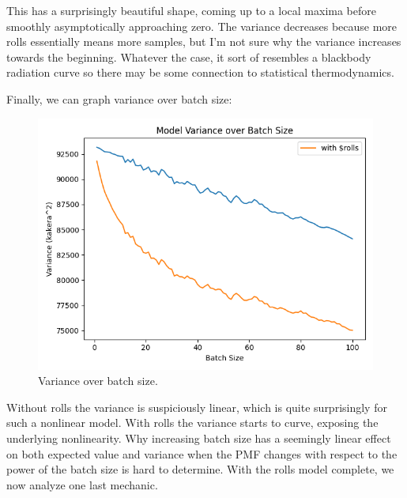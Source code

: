 \documentclass[11pt, oneside]{article}
\theoremstyle{plain}
\theoremstyle{definition}
\begin{document}
This has a surprisingly beautiful shape, coming up to a local maxima
before smoothly asymptotically approaching zero. The variance decreases
because more rolls essentially means more samples, but I'm not sure
why the variance increases towards the beginning. Whatever the case,
it sort of resembles a blackbody radiation curve so there may be some
connection to statistical thermodynamics.

Finally, we can graph variance over batch size:
\begin{figure}[h!]
  \centering
  \includegraphics[scale=0.6]{graphs/variance/batch_size_rolls.png}
  \caption{Variance over batch size.}
\end{figure}

Without rolls the variance is suspiciously linear, which is quite surprisingly
for such a nonlinear model. With rolls the variance starts to curve, exposing
the underlying nonlinearity. Why increasing batch size has a seemingly linear
effect on both expected value and variance when the PMF changes with respect
to the power of the batch size is hard to determine. With the rolls model
complete, we now analyze one last mechanic.
\end{document}

